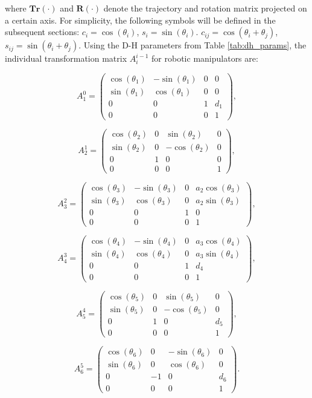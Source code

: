 \documentclass{article}
\newcommand{\mat}[1]{\begin{pmatrix} #1 \end{pmatrix}}
\newcommand{\st}[1]{\sin(\theta_{#1})}
\newcommand{\ct}[1]{\cos(\theta_{#1})}
\begin{document}
where $\mathbf{Tr}(\cdot)$ and $\mathbf{R}(\cdot)$ denote the trajectory and rotation matrix projected on a certain axis.
For simplicity, the following symbols will be defined in the subsequent sections: $c_i = \cos(\theta_i)$, $s_i = \sin(\theta_i)$. $c_{ij} = \cos(\theta_i+\theta_j)$, $s_{ij} = \sin(\theta_i+\theta_j)$.
Using the D-H parameters from Table \ref{tab:dh_params}, the individual transformation matrix $A_i^{i-1}$ for robotic manipulators are:

    \begin{equation}
    A_1^0 = \mat{\ct{1} & -\st{1} & 0 & 0 \\ \st{1} & \ct{1} & 0 & 0 \\ 0 & 0 & 1 & d_1 \\ 0 & 0 & 0 & 1},
    \end{equation}
    

    \begin{equation}
    A_2^1 = \mat{\ct{2} & 0 & \st{2} & 0 \\ \st{2} & 0 & -\ct{2} & 0 \\ 0 & 1 & 0 & 0 \\ 0 & 0 & 0 & 1},
    \end{equation}
    

    \begin{equation}
    A_3^2 = \mat{\ct{3} & -\st{3} & 0 & a_2\ct{3} \\ \st{3} & \ct{3} & 0 & a_2\st{3} \\ 0 & 0 & 1 & 0 \\ 0 & 0 & 0 & 1},
    \end{equation}


    \begin{equation}
    A_4^3 = \mat{\ct{4} & -\st{4} & 0 & a_3\ct{4} \\ \st{4} & \ct{4} & 0 & a_3\st{4} \\ 0 & 0 & 1 & d_4 \\ 0 & 0 & 0 & 1},
    \end{equation}


    \begin{equation}
    A_5^4 = \mat{\ct{5} & 0 & \st{5} & 0 \\ \st{5} & 0 & -\ct{5} & 0 \\ 0 & 1 & 0 & d_5 \\ 0 & 0 & 0 & 1},
    \end{equation}


    \begin{equation}
    A_6^5 = \mat{\ct{6} & 0 & -\st{6} & 0 \\ \st{6} & 0 & \ct{6} & 0 \\ 0 & -1 & 0 & d_6 \\ 0 & 0 & 0 & 1}.
    \end{equation}
\end{document}
